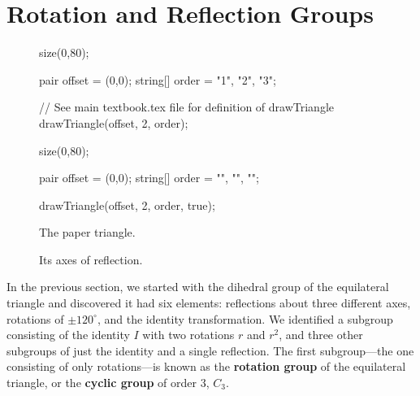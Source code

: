 \documentclass[../textbook.tex]{subfiles}
\begin{document}
\section{Rotation and Reflection Groups}


\begin{figure}[h]
	\begin{center}
		\begin{minipage}[b]{0.45\textwidth}
			\centering
			\begin{asy}[width=0.5\textwidth]
				size(0,80);

				pair offset = (0,0);
				string[] order = {"1", "2", "3"};

				// See main textbook.tex file for definition of drawTriangle
				drawTriangle(offset, 2, order);
			\end{asy}
		\end{minipage}
		\hfill
		\begin{minipage}[b]{0.45\textwidth}
			\centering
			\begin{asy}[width=0.7\textwidth]
				size(0,80);

				pair offset = (0,0);
				string[] order = {"", "", ""};

				drawTriangle(offset, 2, order, true);
			\end{asy}
		\end{minipage}
	\end{center}
	\vspace*{-2\baselineskip}
	\begin{center}
		\begin{minipage}[t]{0.45\textwidth}
			\caption{The paper triangle.}
			\label{fig:paper_triangle}
		\end{minipage}
		\hfill
		\begin{minipage}[t]{0.45\textwidth}
			\caption{Its axes of reflection.}
			\label{fig:triangle_reflections}
		\end{minipage}
	\end{center}
	\vspace*{-2\baselineskip}
\end{figure}

\noindent In the previous section, we started with the dihedral group of the equilateral triangle and discovered it had six elements: reflections about three different axes, rotations of $\pm 120^{\circ}$, and the identity transformation. We identified a subgroup consisting of the identity $I$ with two rotations $r$ and $r^2$, and three other subgroups of just the identity and a single reflection. The first subgroup---the one consisting of only rotations---is known as the \textbf{rotation group} of the equilateral triangle, or the \textbf{cyclic group} of order $3$, $C_3$.
\end{document}
